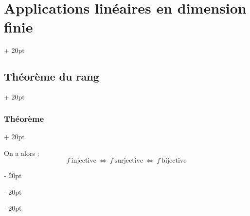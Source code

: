 \documentclass[a4paper, 12pt, twoside]{article}
\newcommand{\ssi}{\ \Leftrightarrow \ }
\newcommand{\ind}[1][20pt]{\advance\leftskip + #1}
\newcommand{\deind}[1][20pt]{\advance\leftskip - #1}
\newenvironment{indt}[2][20pt]{#2 \par \ind[#1]}{\par \deind} %
\begin{document}
\begin{indt}{\section{Applications linéaires en dimension finie}}
\begin{indt}{\subsection{Théorème du rang}}
\begin{indt}{\subsubsection{Théorème}}
                \vspace{6pt}
                
                On a alors :
                \[
                    f\ \text{injective}
                    \ssi
                    f\ \text{surjective}
                    \ssi
                    f\ \text{bijective}
                \]
            \end{indt}
        \end{indt}
    \end{indt}
    
    
    
\end{document}
